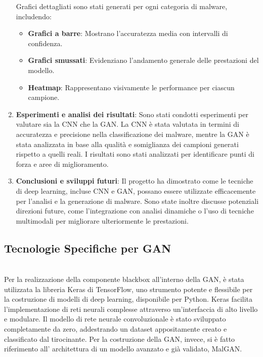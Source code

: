 \begin{enumerate}
    Grafici dettagliati sono stati generati per ogni categoria di malware, includendo:
    \begin{itemize}
        \item \textbf{Grafici a barre}: Mostrano l'accuratezza media con intervalli di confidenza.
        \item \textbf{Grafici smussati}: Evidenziano l'andamento generale delle prestazioni del modello.
        \item \textbf{Heatmap}: Rappresentano visivamente le performance per ciascun campione.
    \end{itemize}

    \item \textbf{Esperimenti e analisi dei risultati}: 
    Sono stati condotti esperimenti per valutare sia la CNN che la GAN. La CNN è stata valutata in termini di accuratezza e precisione nella classificazione dei malware, mentre la GAN è stata analizzata in base alla qualità e somiglianza dei campioni generati rispetto a quelli reali. I risultati sono stati analizzati per identificare punti di forza e aree di miglioramento.

    \item \textbf{Conclusioni e sviluppi futuri}: 
    Il progetto ha dimostrato come le tecniche di deep learning, incluse CNN e GAN, possano essere utilizzate efficacemente per l'analisi e la generazione di malware. Sono state inoltre discusse potenziali direzioni future, come l'integrazione con analisi dinamiche o l'uso di tecniche multimodali per migliorare ulteriormente le prestazioni.
\end{enumerate}


\subsection{Tecnologie Specifiche per GAN}
~\\
\indent Per la realizzazione della componente blackbox all'interno della GAN, è stata utilizzata la libreria Keras di TensorFlow, uno strumento potente e flessibile per la costruzione di modelli di deep learning, disponibile per Python. Keras facilita l'implementazione di reti neurali complesse attraverso un'interfaccia di alto livello e modulare.
Il modello di rete neurale convoluzionale è stato sviluppato completamente da zero, addestrando un dataset appositamente creato e classificato dal tirocinante. Per la costruzione della GAN, invece, si è fatto riferimento all' architettura di un modello avanzato e già validato, MalGAN.

